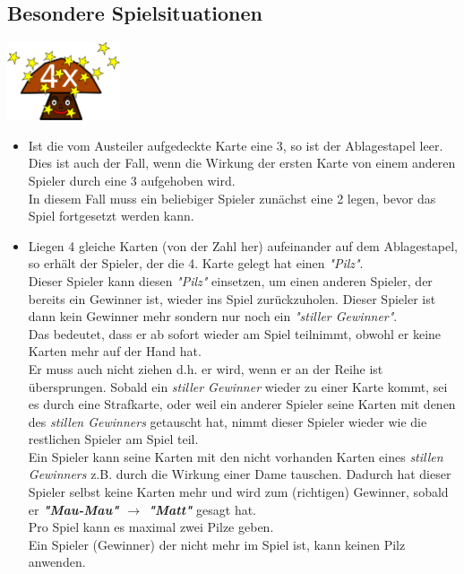 \documentclass{article}
\begin{document}
\subsection*{Besondere Spielsituationen}
\includegraphics[width=0.25\textwidth]{photos/mushroom.png}
\begin{itemize} 
\item Ist die vom Austeiler aufgedeckte Karte eine 3, so ist der Ablagestapel leer. \\ Dies ist auch der Fall, wenn die Wirkung der ersten Karte von einem anderen Spieler durch eine 3 aufgehoben wird. \\ In diesem Fall muss ein beliebiger Spieler zunächst eine 2 legen, bevor das Spiel fortgesetzt werden kann.

\item Liegen 4 gleiche Karten (von der Zahl her) aufeinander auf dem Ablagestapel, so erhält der Spieler,  der die 4. Karte gelegt hat einen \textit{"Pilz"}. \\  Dieser Spieler kann diesen \textit{"Pilz"} einsetzen, um einen anderen Spieler, der bereits ein Gewinner ist, wieder ins Spiel zurückzuholen. Dieser Spieler ist dann kein Gewinner mehr sondern nur noch ein \textit{"stiller Gewinner"}. \\ Das bedeutet, dass er ab sofort wieder am Spiel teilnimmt, obwohl er keine Karten mehr auf der Hand hat. \\ Er muss auch nicht ziehen d.h. er wird, wenn er an der Reihe ist übersprungen. Sobald ein \textit{stiller Gewinner} wieder zu einer Karte kommt, sei es durch eine Strafkarte, oder weil ein anderer Spieler seine Karten mit denen des \textit{stillen Gewinners} getauscht hat, nimmt dieser Spieler wieder wie die restlichen Spieler am Spiel teil. \\
Ein Spieler kann seine Karten mit den nicht vorhanden Karten eines \textit{stillen Gewinners} z.B. durch die Wirkung einer Dame tauschen. Dadurch hat dieser Spieler selbst keine Karten mehr und wird zum (richtigen) Gewinner, sobald er \textit{\textbf{"Mau-Mau" $\rightarrow$ "Matt"}} gesagt hat. \\
Pro Spiel kann es maximal zwei Pilze geben. \\
Ein Spieler (Gewinner) der nicht mehr im Spiel ist,
kann keinen Pilz anwenden.
         

\end{itemize}
\end{document}
